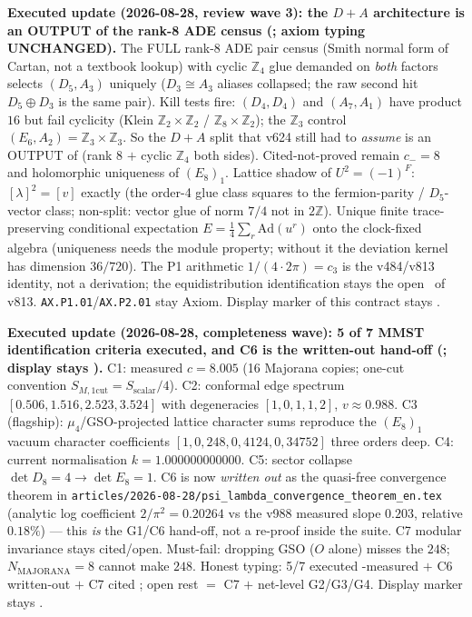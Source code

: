 \par\smallskip\noindent\textbf{Executed update (2026-08-28, review wave 3): the $D{+}A$ architecture
is an OUTPUT of the rank-8 ADE census
(; axiom typing
UNCHANGED).}
The FULL rank-8 ADE pair census (Smith normal form of Cartan, not a textbook lookup) with cyclic
$\mathbb Z_4$ glue demanded on \emph{both} factors selects $(D_5,A_3)$ uniquely ($D_3\cong A_3$
aliases collapsed; the raw second hit $D_5\oplus D_3$ is the same pair).  Kill tests fire: $(D_4,D_4)$
and $(A_7,A_1)$ have product $16$ but fail cyclicity (Klein $\mathbb Z_2\times\mathbb Z_2$ /
$\mathbb Z_8\times\mathbb Z_2$); the $\mathbb Z_3$ control $(E_6,A_2)=\mathbb Z_3\times\mathbb Z_3$.
So the $D{+}A$ split that v624 still had to \emph{assume} is an OUTPUT of (rank $8$ $+$ cyclic
$\mathbb Z_4$ both sides).  Cited-not-proved remain $c_-=8$ and holomorphic uniqueness of $(E_8)_1$.
Lattice shadow of $U^2=(-1)^F$: $[\lambda]^2=[v]$ exactly (the order-4 glue class squares to the
fermion-parity / $D_5$-vector class; non-split: vector glue of norm $7/4$ not in $2\mathbb Z$).
Unique finite trace-preserving conditional expectation $E=\tfrac14\sum_r\mathrm{Ad}(u^r)$ onto the
clock-fixed algebra (uniqueness needs the module property; without it the deviation kernel has
dimension $36/720$).  The P1 arithmetic $1/(4\cdot 2\pi)=c_3$ is the v484/v813 identity, not a
derivation; the equidistribution identification stays the open \mC\ of v813.
\texttt{AX.P1.01}/\texttt{AX.P2.01} stay Axiom.  Display marker of this contract stays \mO.

\par\smallskip\noindent\textbf{Executed update (2026-08-28, completeness wave): 5 of 7 MMST
identification criteria executed, and C6 is the written-out hand-off
(; display stays \mO).}
C1: measured $c=8.005$ (16 Majorana copies; one-cut convention $S_{M,1\mathrm{cut}}=S_{\mathrm{scalar}}/4$).
C2: conformal edge spectrum $[0.506,1.516,2.523,3.524]$ with degeneracies $[1,0,1,1,2]$, $v\approx0.988$.
C3 (flagship): $\mu_4$/GSO-projected lattice character sums reproduce the $(E_8)_1$ vacuum character
coefficients $[1,0,248,0,4124,0,34752]$ three orders deep.  C4: current normalisation
$k=1.000000000000$.  C5: sector collapse $\det D_8=4\to\det E_8=1$.
C6 is now \emph{written out} as the quasi-free convergence theorem in
\texttt{articles/2026-08-28/psi\_lambda\_convergence\_theorem\_en.tex} (analytic log coefficient
$2/\pi^2=0.20264$ vs the v988 measured slope $0.203$, relative $0.18\%$) --- this \emph{is} the
G1/C6 hand-off, not a re-proof inside the suite.  C7 modular invariance stays cited/open.
Must-fail: dropping GSO ($O$ alone) misses the $248$; $N_{\mathrm{MAJORANA}}=8$ cannot make $248$.
Honest typing: 5/7 executed \mE-measured $+$ C6 written-out \mC $+$ C7 cited \mO; open rest $=$
C7 $+$ net-level G2/G3/G4.  Display marker stays \mO.

